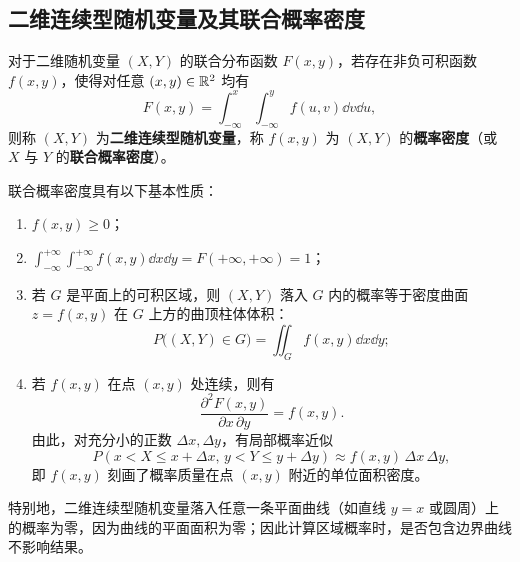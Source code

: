 \subsection{二维连续型随机变量及其联合概率密度}

\begin{definition}[二维连续型随机变量与联合概率密度]
\label{def:joint-pdf}
对于二维随机变量 $(X,Y)$ 的联合分布函数 $F(x,y)$，若存在非负可积函数 $f(x,y)$，使得对任意 $(x,y)\in\mathbb{R}^2$ 均有
\begin{equation}
  F(x,y)=\int_{-\infty}^{x}\int_{-\infty}^{y}f(u,v)\dd v\dd u,
  \label{eq:joint-pdf-def}
\end{equation}
则称 $(X,Y)$ 为\textbf{二维连续型随机变量}，称 $f(x,y)$ 为 $(X,Y)$ 的\textbf{概率密度}（或 $X$ 与 $Y$ 的\textbf{联合概率密度}）。
\end{definition}

联合概率密度具有以下基本性质：
\begin{enumerate}
  \item $f(x,y)\ge 0$；
  \item $\displaystyle\int_{-\infty}^{+\infty}\int_{-\infty}^{+\infty}f(x,y)\dd x\dd y=F(+\infty,+\infty)=1$；
  \item 若 $G$ 是平面上的可积区域，则 $(X,Y)$ 落入 $G$ 内的概率等于密度曲面 $z=f(x,y)$ 在 $G$ 上方的曲顶柱体体积：
  \begin{equation}
    P\bigl((X,Y)\in G\bigr)=\iint_{G}f(x,y)\dd x\dd y;
    \label{eq:joint-area-prob}
  \end{equation}
  \item 若 $f(x,y)$ 在点 $(x,y)$ 处连续，则有
  \[
    \frac{\partial^2 F(x,y)}{\partial x\,\partial y}=f(x,y).
  \]
  由此，对充分小的正数 $\Delta x,\Delta y$，有局部概率近似
  \[
    P(x<X\le x+\Delta x,\,y<Y\le y+\Delta y)\approx f(x,y)\,\Delta x\,\Delta y,
  \]
  即 $f(x,y)$ 刻画了概率质量在点 $(x,y)$ 附近的单位面积密度。
\end{enumerate}

特别地，二维连续型随机变量落入任意一条平面曲线（如直线 $y=x$ 或圆周）上的概率为零，因为曲线的平面面积为零；因此计算区域概率时，是否包含边界曲线不影响结果。

